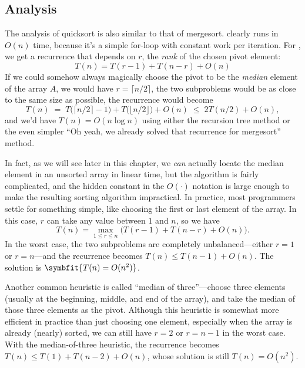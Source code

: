 \subsection{Analysis}
The analysis of quicksort is also similar to that of mergesort.  clearly runs in $O(n)$ time, because it’s a simple for-loop with constant work per iteration. For , we get a recurrence that depends on $r$, the \emph{rank} of the chosen pivot element:
\[
T(n) = T(r-1) + T(n-r) + O(n)
\]
If we could somehow always magically choose the pivot to be the \emph{median} element of the array $A$, we would have $r = \lceil n/2\rceil$, the two subproblems would be as close to the same size as possible, the recurrence would become
\[
T(n) \;=\; T\bigl(\lceil n/2\rceil - 1\bigr) + T\bigl(\lfloor n/2\rfloor\bigr) + O(n) \;\le\; 2T(n/2) + O(n),
\]
and we’d have $T(n) = O(n \log n)$ using either the recursion tree method or the even simpler “Oh yeah, we already solved that recurrence for mergesort” method.

In fact, as we will see later in this chapter, we \emph{can} actually locate the median element in an unsorted array in linear time, but the algorithm is fairly complicated, and the hidden constant in the $O(\cdot)$ notation is large enough to make the resulting sorting algorithm impractical. In practice, most programmers settle for something simple, like choosing the first or last element of the array. In this case, $r$ can take any value between $1$ and $n$, so we have
\[
T(n) = \max_{1 \le r \le n} \bigl(T(r-1) + T(n-r) + O(n)\bigr).
\]
In the worst case, the two subproblems are completely unbalanced—either $r = 1$ or $r = n$—and the recurrence becomes $T(n) \le T(n - 1) + O(n)$. The solution is $\symbfit{T(n) = O(n^2)}$.

Another common heuristic is called “median of three”—choose three elements (usually at the beginning, middle, and end of the array), and take the median of those three elements as the pivot. Although this heuristic is somewhat more efficient in practice than just choosing one element, especially when the array is already (nearly) sorted, we can still have $r = 2$ or $r = n - 1$ in the worst case. With the median-of-three heuristic, the recurrence becomes $T(n) \le T(1) + T(n - 2) + O(n)$, whose solution is still $T(n) = O(n^2)$.

